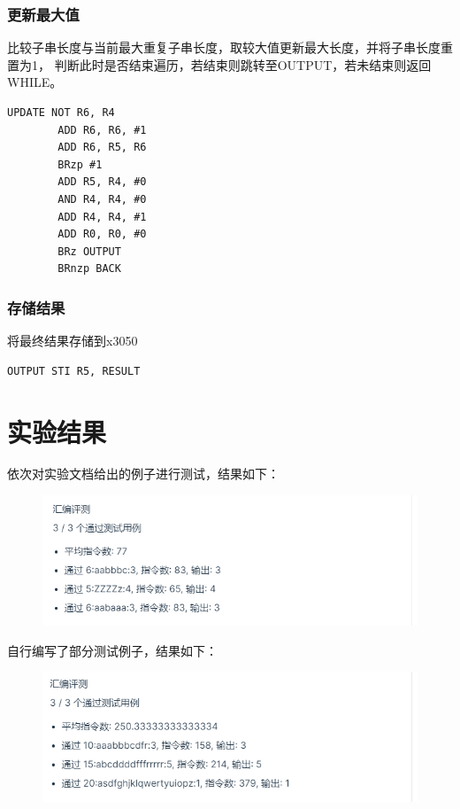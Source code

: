 \documentclass[12pt, a4paper, oneside]{ctexart}
\begin{document}
\subsubsection*{更新最大值}
比较子串长度与当前最大重复子串长度，取较大值更新最大长度，并将子串长度重置为1，
判断此时是否结束遍历，若结束则跳转至OUTPUT，若未结束则返回WHILE。
\begin{lstlisting}[name = code, firstnumber = last]
    UPDATE NOT R6, R4
        ADD R6, R6, #1
        ADD R6, R5, R6
        BRzp #1
        ADD R5, R4, #0
        AND R4, R4, #0
        ADD R4, R4, #1
        ADD R0, R0, #0
        BRz OUTPUT
        BRnzp BACK
\end{lstlisting}
\subsubsection*{存储结果}
将最终结果存储到x3050
\begin{lstlisting}[name = code, firstnumber = last]
    OUTPUT STI R5, RESULT
\end{lstlisting}

\section*{实验结果}
依次对实验文档给出的例子进行测试，结果如下：
\begin{figure}[H]
    \centering
    \includegraphics[scale=0.8]{Output1.png}
\end{figure}
自行编写了部分测试例子，结果如下：
\begin{figure}[H]
    \centering
    \includegraphics[scale=0.8]{Output2.png}
\end{figure}
\end{document}
